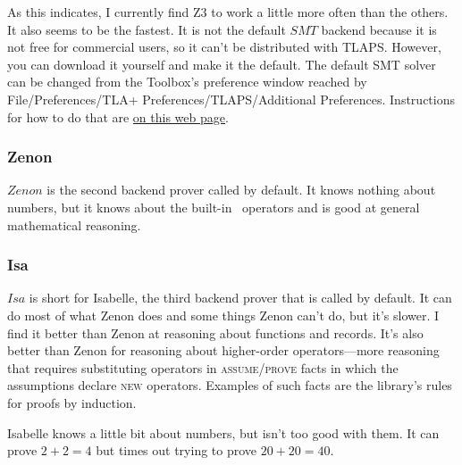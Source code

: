 \documentclass[fleqn,leqno]{article}
\begin{document}
As this indicates, I currently find Z3 to work a little more often
than the others.  It also seems to be the fastest.  It is not the
default $SMT$ backend because it is not free for commercial users, so
it can't be distributed with TLAPS\@.  However, you can download it
yourself and make it the default.  The default SMT solver can be
changed from the Toolbox's preference window reached by
\textsf{File/Preferences/TLA+ Preferences/TLAPS/Additional
Preferences}\@.  Instructions for how to do that are
  \hyperref{http://tla.msr-inria.inria.fr/tlaps/content/Documentation/Tutorial/Tactics.html}{}{}{on this web page}.
  


\vspace{-\baselineskip}%
\subsubsection*{Zenon}

$Zenon$ is the second backend prover called by default.  It knows
nothing about numbers, but it knows about the built-in \tlaplus\
operators and is good at general mathematical reasoning.  

\vspace{-\baselineskip}%
%
\ctindex{1}{Isa@\mmath{Isa} (\icmd{textsc}{by} fact)}{Isa}%
\subsubsection*{Isa}

$Isa$ is short for Isabelle, the third backend prover that is called
by default.  It can do most of what Zenon does and some things Zenon
can't do, but it's slower.  I find it better than Zenon at reasoning
about functions and records.  It's also better than Zenon for reasoning
about higher-order operators---more reasoning that requires
substituting operators in \textsc{assume}/\textsc{prove} facts in
which the assumptions declare \textsc{new} operators.  Examples of
such facts are the library's rules for proofs by induction.

Isabelle knows a little bit about numbers, but isn't too
good with them.  It can prove $2+2=4$ but times out trying to prove
$20+20=40$.
\end{document}
